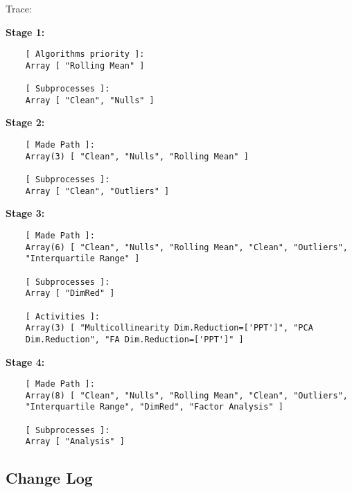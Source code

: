 \documentclass[a4paper]{article}
\begin{document}
\medskip
Trace:

\medskip
\textbf{Stage 1:}
\begin{verbatim}
    [ Algorithms priority ]:
    Array [ "Rolling Mean" ]

    [ Subprocesses ]:
    Array [ "Clean", "Nulls" ]
\end{verbatim}

\textbf{Stage 2:}
\begin{verbatim}
    [ Made Path ]:
    Array(3) [ "Clean", "Nulls", "Rolling Mean" ]
    
    [ Subprocesses ]:
    Array [ "Clean", "Outliers" ]
\end{verbatim}

\textbf{Stage 3:}
\begin{verbatim}
    [ Made Path ]:
    Array(6) [ "Clean", "Nulls", "Rolling Mean", "Clean", "Outliers",
    "Interquartile Range" ]
    
    [ Subprocesses ]:
    Array [ "DimRed" ]
    
    [ Activities ]:
    Array(3) [ "Multicollinearity Dim.Reduction=['PPT']", "PCA
    Dim.Reduction", "FA Dim.Reduction=['PPT']" ]
\end{verbatim}

\textbf{Stage 4:}
\begin{verbatim}
    [ Made Path ]:
    Array(8) [ "Clean", "Nulls", "Rolling Mean", "Clean", "Outliers",
    "Interquartile Range", "DimRed", "Factor Analysis" ]
    
    [ Subprocesses ]:
    Array [ "Analysis" ]
\end{verbatim}


\subsection{Change Log}
\label{sec:org03eceac}
\end{document}
